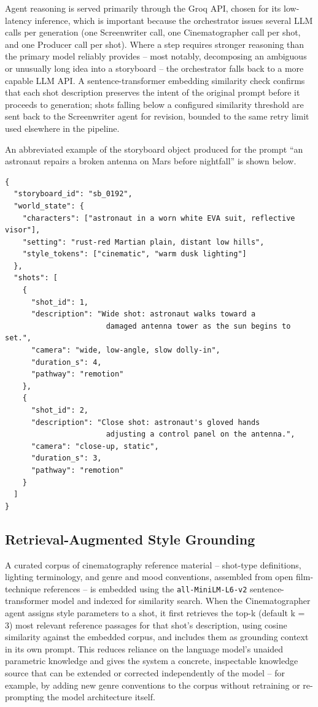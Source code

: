 \documentclass[11pt,a4paper]{article}
\begin{document}
Agent reasoning is served primarily through the Groq API, chosen for its low-latency inference, which is important because the orchestrator issues several LLM calls per generation (one Screenwriter call, one Cinematographer call per shot, and one Producer call per shot). Where a step requires stronger reasoning than the primary model reliably provides -- most notably, decomposing an ambiguous or unusually long idea into a storyboard -- the orchestrator falls back to a more capable LLM API. A sentence-transformer embedding similarity check confirms that each shot description preserves the intent of the original prompt before it proceeds to generation; shots falling below a configured similarity threshold are sent back to the Screenwriter agent for revision, bounded to the same retry limit used elsewhere in the pipeline.

An abbreviated example of the storyboard object produced for the prompt ``an astronaut repairs a broken antenna on Mars before nightfall'' is shown below.

\begin{verbatim}
{
  "storyboard_id": "sb_0192",
  "world_state": {
    "characters": ["astronaut in a worn white EVA suit, reflective visor"],
    "setting": "rust-red Martian plain, distant low hills",
    "style_tokens": ["cinematic", "warm dusk lighting"]
  },
  "shots": [
    {
      "shot_id": 1,
      "description": "Wide shot: astronaut walks toward a
                       damaged antenna tower as the sun begins to set.",
      "camera": "wide, low-angle, slow dolly-in",
      "duration_s": 4,
      "pathway": "remotion"
    },
    {
      "shot_id": 2,
      "description": "Close shot: astronaut's gloved hands
                       adjusting a control panel on the antenna.",
      "camera": "close-up, static",
      "duration_s": 3,
      "pathway": "remotion"
    }
  ]
}
\end{verbatim}

\subsection{Retrieval-Augmented Style Grounding}

A curated corpus of cinematography reference material -- shot-type definitions, lighting terminology, and genre and mood conventions, assembled from open film-technique references -- is embedded using the \texttt{all-MiniLM-L6-v2} sentence-transformer model and indexed for similarity search. When the Cinematographer agent assigns style parameters to a shot, it first retrieves the top-k (default k = 3) most relevant reference passages for that shot's description, using cosine similarity against the embedded corpus, and includes them as grounding context in its own prompt. This reduces reliance on the language model's unaided parametric knowledge and gives the system a concrete, inspectable knowledge source that can be extended or corrected independently of the model -- for example, by adding new genre conventions to the corpus without retraining or re-prompting the model architecture itself.
\end{document}
